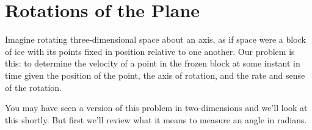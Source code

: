 \documentclass{ximera}
\begin{document}
\section{Rotations of the Plane}

Imagine rotating three-dimensional space about an axis, as if space were a block of ice with its points fixed in position relative to one another. Our problem is this: to determine the velocity of a point in the frozen block at some instant in time given the position of the point, the axis of rotation, and the rate and sense of the rotation.

 
\begin{onlineOnly}
    \begin{center}
\end{center}
\end{onlineOnly}





You may have seen a version of this problem in two-dimensions and we'll look at this shortly. But first we'll review what it means to measure an angle in radians.
\end{document}
